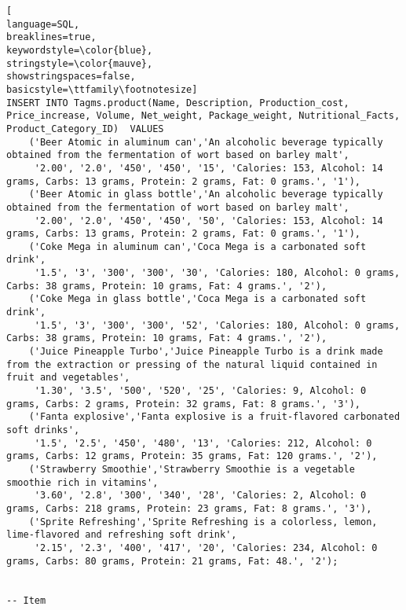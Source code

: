 \begin{lstlisting}[
language=SQL,
breaklines=true,
keywordstyle=\color{blue},
stringstyle=\color{mauve},
showstringspaces=false,
basicstyle=\ttfamily\footnotesize]
INSERT INTO Tagms.product(Name, Description, Production_cost, Price_increase, Volume, Net_weight, Package_weight, Nutritional_Facts, Product_Category_ID)  VALUES
    ('Beer Atomic in aluminum can','An alcoholic beverage typically obtained from the fermentation of wort based on barley malt',
     '2.00', '2.0', '450', '450', '15', 'Calories: 153, Alcohol: 14 grams, Carbs: 13 grams, Protein: 2 grams, Fat: 0 grams.', '1'),
    ('Beer Atomic in glass bottle','An alcoholic beverage typically obtained from the fermentation of wort based on barley malt',
     '2.00', '2.0', '450', '450', '50', 'Calories: 153, Alcohol: 14 grams, Carbs: 13 grams, Protein: 2 grams, Fat: 0 grams.', '1'),
    ('Coke Mega in aluminum can','Coca Mega is a carbonated soft drink',
     '1.5', '3', '300', '300', '30', 'Calories: 180, Alcohol: 0 grams, Carbs: 38 grams, Protein: 10 grams, Fat: 4 grams.', '2'),
    ('Coke Mega in glass bottle','Coca Mega is a carbonated soft drink',
     '1.5', '3', '300', '300', '52', 'Calories: 180, Alcohol: 0 grams, Carbs: 38 grams, Protein: 10 grams, Fat: 4 grams.', '2'),
    ('Juice Pineapple Turbo','Juice Pineapple Turbo is a drink made from the extraction or pressing of the natural liquid contained in fruit and vegetables',
     '1.30', '3.5', '500', '520', '25', 'Calories: 9, Alcohol: 0 grams, Carbs: 2 grams, Protein: 32 grams, Fat: 8 grams.', '3'),
    ('Fanta explosive','Fanta explosive is a fruit-flavored carbonated soft drinks',
     '1.5', '2.5', '450', '480', '13', 'Calories: 212, Alcohol: 0 grams, Carbs: 12 grams, Protein: 35 grams, Fat: 120 grams.', '2'),
    ('Strawberry Smoothie','Strawberry Smoothie is a vegetable smoothie rich in vitamins',
     '3.60', '2.8', '300', '340', '28', 'Calories: 2, Alcohol: 0 grams, Carbs: 218 grams, Protein: 23 grams, Fat: 8 grams.', '3'),
    ('Sprite Refreshing','Sprite Refreshing is a colorless, lemon, lime-flavored and refreshing soft drink',
     '2.15', '2.3', '400', '417', '20', 'Calories: 234, Alcohol: 0 grams, Carbs: 80 grams, Protein: 21 grams, Fat: 48.', '2');


-- Item


\end{lstlisting}
